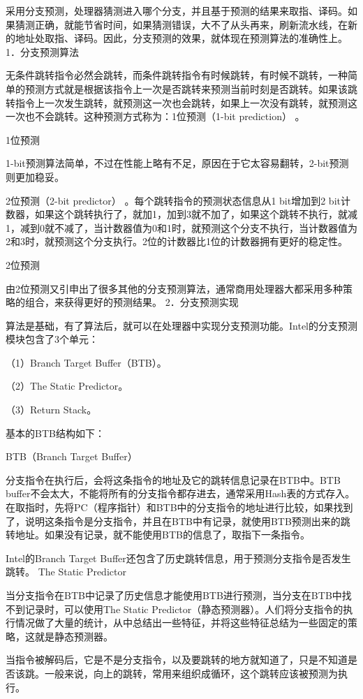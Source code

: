 \documentclass[12pt,UTF8]{ctexbook}
\begin{document}
采用分支预测，处理器猜测进入哪个分支，并且基于预测的结果来取指、译码。如果猜测正确，就能节省时间，如果猜测错误，大不了从头再来，刷新流水线，在新的地址处取指、译码。因此，分支预测的效果，就体现在预测算法的准确性上。
1．分支预测算法

无条件跳转指令必然会跳转，而条件跳转指令有时候跳转，有时候不跳转，一种简单的预测方式就是根据该指令上一次是否跳转来预测当前时刻是否跳转。如果该跳转指令上一次发生跳转，就预测这一次也会跳转，如果上一次没有跳转，就预测这一次也不会跳转。这种预测方式称为：1位预测（1-bit prediction） 。

1位预测

1-bit预测算法简单，不过在性能上略有不足，原因在于它太容易翻转，2-bit预测则更加稳妥。

2位预测（2-bit predictor） 。每个跳转指令的预测状态信息从1 bit增加到2 bit计数器，如果这个跳转执行了，就加1，加到3就不加了，如果这个跳转不执行，就减1，减到0就不减了，当计数器值为0和1时，就预测这个分支不执行，当计数器值为2和3时，就预测这个分支执行。2位的计数器比1位的计数器拥有更好的稳定性。

2位预测

由2位预测又引申出了很多其他的分支预测算法，通常商用处理器大都采用多种策略的组合，来获得更好的预测结果。
2．分支预测实现

算法是基础，有了算法后，就可以在处理器中实现分支预测功能。Intel的分支预测模块包含了3个单元：

（1）Branch Target Buffer（BTB）。

（2）The Static Predictor。

（3）Return Stack。

基本的BTB结构如下：

BTB（Branch Target Buffer）

分支指令在执行后，会将这条指令的地址及它的跳转信息记录在BTB中。BTB buffer不会太大，不能将所有的分支指令都存进去，通常采用Hash表的方式存入。在取指时，先将PC（程序指针）和BTB中的分支指令的地址进行比较，如果找到了，说明这条指令是分支指令，并且在BTB中有记录，就使用BTB预测出来的跳转地址。如果没有记录，就不能使用BTB的信息了，取指下一条指令。

Intel的Branch Target Buffer还包含了历史跳转信息，用于预测分支指令是否发生跳转。
The Static Predictor

当分支指令在BTB中记录了历史信息才能使用BTB进行预测，当分支在BTB中找不到记录时，可以使用The Static Predictor（静态预测器）。人们将分支指令的执行情况做了大量的统计，从中总结出一些特征，并将这些特征总结为一些固定的策略，这就是静态预测器。

当指令被解码后，它是不是分支指令，以及要跳转的地方就知道了，只是不知道是否该跳。一般来说，向上的跳转，常用来组织成循环，这个跳转应该被预测为执行。
\end{document}
